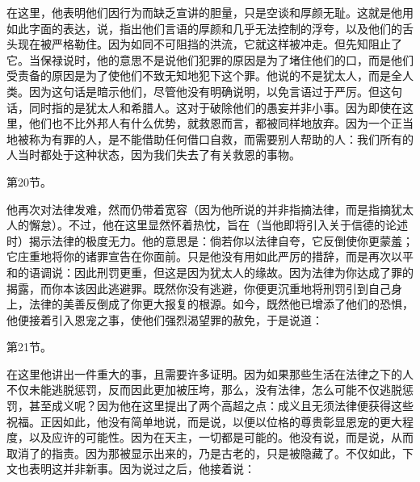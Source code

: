 \par

在这里，他表明他们因行为而缺乏宣讲的胆量，只是空谈和厚颜无耻。这就是他用如此字面的表达，说，指出他们言语的厚颜和几乎无法控制的浮夸，以及他们的舌头现在被严格勒住。因为如同不可阻挡的洪流，它就这样被冲走。但先知阻止了它。当保禄说时，他的意思不是说他们犯罪的原因是为了堵住他们的口，而是他们受责备的原因是为了使他们不致无知地犯下这个罪。他说的不是犹太人，而是全人类。因为这句话是暗示他们，尽管他没有明确说明，以免言语过于严厉。但这句话，同时指的是犹太人和希腊人。这对于破除他们的愚妄并非小事。因为即使在这里，他们也不比外邦人有什么优势，就救恩而言，都被同样地放弃。因为一个正当地被称为有罪的人，是不能借助任何借口自救，而需要别人帮助的人：我们所有的人当时都处于这种状态，因为我们失去了有关救恩的事物。\par

第20节。\par

他再次对法律发难，然而仍带着宽容（因为他所说的并非指摘法律，而是指摘犹太人的懈怠）。不过，他在这里显然怀着热忱，旨在（当他即将引入关于信德的论述时）揭示法律的极度无力。他的意思是：倘若你以法律自夸，它反倒使你更蒙羞；它庄重地将你的诸罪宣告在你面前。只是他没有用如此严厉的措辞，而是再次以平和的语调说：因此刑罚更重，但这是因为犹太人的缘故。因为法律为你达成了罪的揭露，而你本该因此逃避罪。既然你没有逃避，你便更沉重地将刑罚引到自己身上，法律的美善反倒成了你更大报复的根源。如今，既然他已增添了他们的恐惧，他便接着引入恩宠之事，使他们强烈渴望罪的赦免，于是说道：\par

第21节。\par

在这里他讲出一件重大的事，且需要许多证明。因为如果那些生活在法律之下的人不仅未能逃脱惩罚，反而因此更加被压垮，那么，没有法律，怎么可能不仅逃脱惩罚，甚至成义呢？因为他在这里提出了两个高超之点：成义且无须法律便获得这些祝福。正因如此，他没有简单地说，而是说，以便以位格的尊贵彰显恩宠的更大程度，以及应许的可能性。因为在天主，一切都是可能的。他没有说，而是说，从而取消了的指责。因为那被显示出来的，乃是古老的，只是被隐藏了。不仅如此，下文也表明这并非新事。因为说过之后，他接着说：\par

